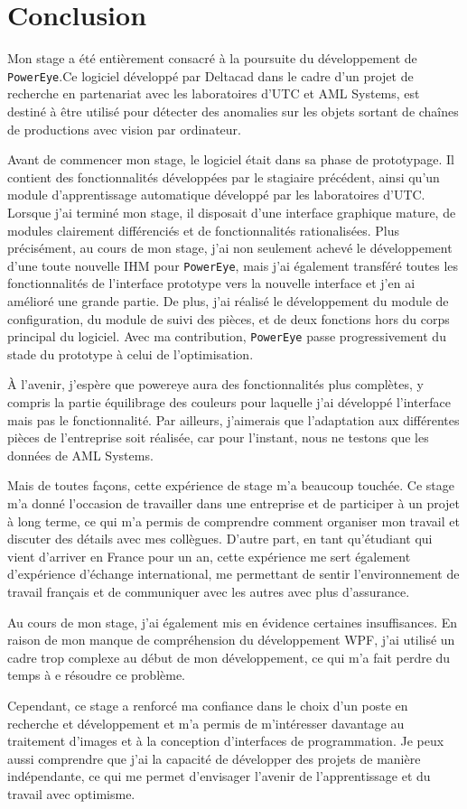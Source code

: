 \chapter{Conclusion}
Mon stage a été entièrement consacré à la poursuite du développement de \texttt{PowerEye}.Ce logiciel développé par Deltacad dans le cadre d’un projet de recherche en partenariat avec les laboratoires d’UTC et AML Systems, est destiné à être utilisé pour détecter des anomalies sur les objets sortant de chaînes de productions avec vision par ordinateur. 

Avant de commencer mon stage, le logiciel était dans sa phase de prototypage. Il contient des fonctionnalités développées par le stagiaire précédent, ainsi qu'un module d'apprentissage automatique développé par les laboratoires d'UTC. Lorsque j'ai terminé mon stage, il disposait d'une interface graphique mature, de modules clairement différenciés et de fonctionnalités rationalisées. Plus précisément, au cours de mon stage, j'ai non seulement achevé le développement d'une toute nouvelle IHM pour \texttt{PowerEye}, mais j'ai également transféré toutes les fonctionnalités de l'interface prototype vers la nouvelle interface et j'en ai amélioré une grande partie. De plus, j'ai réalisé le développement du module de configuration, du module de suivi des pièces, et de deux fonctions hors du corps principal du logiciel. Avec ma contribution, \texttt{PowerEye} passe progressivement du stade du prototype à celui de l'optimisation.

À l'avenir, j'espère que powereye aura des fonctionnalités plus complètes, y compris la partie équilibrage des couleurs pour laquelle j'ai développé l'interface mais pas le fonctionnalité. Par ailleurs, j'aimerais que l'adaptation aux différentes pièces de l'entreprise soit réalisée, car pour l'instant, nous ne testons que les données de AML Systems. 

Mais de toutes façons, cette expérience de stage m'a beaucoup touchée. Ce stage m'a donné l'occasion de travailler dans une entreprise et de participer à un projet à long terme, ce qui m'a permis de comprendre comment organiser mon travail et discuter des détails avec mes collègues. D'autre part, en tant qu'étudiant qui vient d'arriver en France pour un an, cette expérience me sert également d'expérience d'échange international, me permettant de sentir l'environnement de travail français et de communiquer avec les autres avec plus d'assurance. 

Au cours de mon stage, j'ai également mis en évidence certaines insuffisances. En raison de mon manque de compréhension du développement WPF, j'ai utilisé un cadre trop complexe au début de mon développement, ce qui m'a fait perdre du temps à e résoudre ce problème. 

Cependant, ce stage a renforcé ma confiance dans le choix d'un poste en recherche et développement et m'a permis de m'intéresser davantage au traitement d'images et à la conception d'interfaces de programmation. Je peux aussi comprendre que j'ai la capacité de développer des projets de manière indépendante, ce qui me permet d'envisager l'avenir de l'apprentissage et du travail avec optimisme.